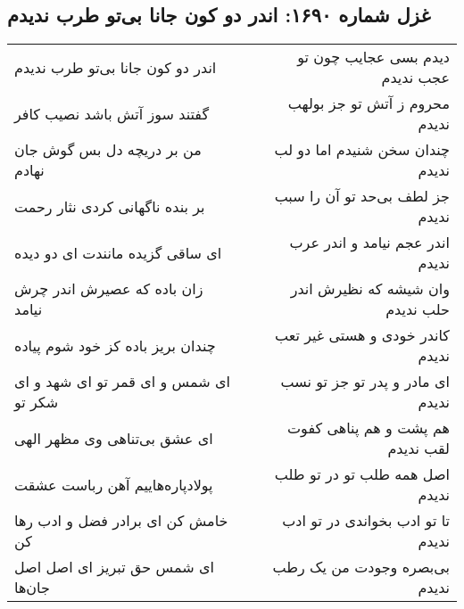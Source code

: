 \begin{center}
\section*{غزل شماره ۱۶۹۰: اندر دو کون جانا بی‌تو طرب ندیدم}
\label{sec:1690}
\begin{longtable}{l p{0.5cm} r}
اندر دو کون جانا بی‌تو طرب ندیدم
&&
دیدم بسی عجایب چون تو عجب ندیدم
\\
گفتند سوز آتش باشد نصیب کافر
&&
محروم ز آتش تو جز بولهب ندیدم
\\
من بر دریچه دل بس گوش جان نهادم
&&
چندان سخن شنیدم اما دو لب ندیدم
\\
بر بنده ناگهانی کردی نثار رحمت
&&
جز لطف بی‌حد تو آن را سبب ندیدم
\\
ای ساقی گزیده مانندت ای دو دیده
&&
اندر عجم نیامد و اندر عرب ندیدم
\\
زان باده که عصیرش اندر چرش نیامد
&&
وان شیشه که نظیرش اندر حلب ندیدم
\\
چندان بریز باده کز خود شوم پیاده
&&
کاندر خودی و هستی غیر تعب ندیدم
\\
ای شمس و ای قمر تو ای شهد و ای شکر تو
&&
ای مادر و پدر تو جز تو نسب ندیدم
\\
ای عشق بی‌تناهی وی مظهر الهی
&&
هم پشت و هم پناهی کفوت لقب ندیدم
\\
پولادپاره‌هاییم آهن رباست عشقت
&&
اصل همه طلب تو در تو طلب ندیدم
\\
خامش کن ای برادر فضل و ادب رها کن
&&
تا تو ادب بخواندی در تو ادب ندیدم
\\
ای شمس حق تبریز ای اصل اصل جان‌ها
&&
بی‌بصره وجودت من یک رطب ندیدم
\\
\end{longtable}
\end{center}
